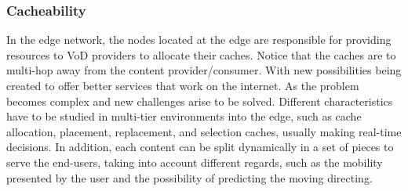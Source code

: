 \subsubsection{Cacheability}


In the edge network, the nodes located at the edge are responsible for providing resources to VoD providers to allocate their caches. 
Notice that the caches are to multi-hop away from the content provider/consumer. 
With new possibilities being created to offer better services that work on the internet. As the problem becomes complex and new challenges arise to be solved. Different characteristics have to be studied in multi-tier environments into the edge, such as cache allocation, placement, replacement, and selection caches, usually making real-time decisions. In addition, each content can be split dynamically in a set of pieces to serve the end-users, taking into account different regards, such as the mobility presented by the user and the possibility of predicting the moving directing. 

